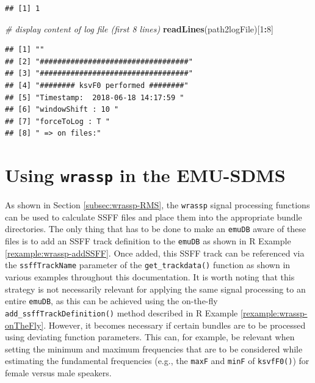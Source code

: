 \documentclass[]{book}
\newenvironment{Shaded}{\begin{snugshade}}{\end{snugshade}}
\newcommand{\CommentTok}[1]{\textcolor[rgb]{0.56,0.35,0.01}{\textit{#1}}}
\newcommand{\DecValTok}[1]{\textcolor[rgb]{0.00,0.00,0.81}{#1}}
\newcommand{\KeywordTok}[1]{\textcolor[rgb]{0.13,0.29,0.53}{\textbf{#1}}}
\newcommand{\NormalTok}[1]{#1}
\newcommand{\OperatorTok}[1]{\textcolor[rgb]{0.81,0.36,0.00}{\textbf{#1}}}
\theoremstyle{definition}
\theoremstyle{definition}
\theoremstyle{definition}
\theoremstyle{remark}
\begin{document}
\begin{verbatim}
## [1] 1
\end{verbatim}

\begin{Shaded}
\begin{Highlighting}[]
\CommentTok{# display content of log file (first 8 lines)}
\KeywordTok{readLines}\NormalTok{(path2logFile)[}\DecValTok{1}\OperatorTok{:}\DecValTok{8}\NormalTok{]}
\end{Highlighting}
\end{Shaded}

\begin{verbatim}
## [1] ""                                  
## [2] "##################################"
## [3] "##################################"
## [4] "######## ksvF0 performed ########" 
## [5] "Timestamp:  2018-06-18 14:17:59 "  
## [6] "windowShift : 10 "                 
## [7] "forceToLog : T "                   
## [8] " => on files:"
\end{verbatim}

\hypertarget{sec:wrassp_emu-sdms}{%
\section{\texorpdfstring{Using \texttt{wrassp} in the
EMU-SDMS}{Using wrassp in the EMU-SDMS}}\label{sec:wrassp_emu-sdms}}

As shown in Section \ref{subsec:wrassp-RMS}, the \texttt{wrassp} signal
processing functions can be used to calculate SSFF files and place them
into the appropriate bundle directories. The only thing that has to be
done to make an \texttt{emuDB} aware of these files is to add an SSFF
track definition to the \texttt{emuDB} as shown in R Example
\ref{rexample:wrassp-addSSFF}. Once added, this SSFF track can be
referenced via the \texttt{ssffTrackName} parameter of the
\texttt{get\_trackdata()} function as shown in various examples
throughout this documentation. It is worth noting that this strategy is
not necessarily relevant for applying the same signal processing to an
entire \texttt{emuDB}, as this can be achieved using the on-the-fly
\texttt{add\_ssffTrackDefinition()} method described in R Example
\ref{rexample:wrassp-onTheFly}. However, it becomes necessary if certain
bundles are to be processed using deviating function parameters. This
can, for example, be relevant when setting the minimum and maximum
frequencies that are to be considered while estimating the fundamental
frequencies (e.g., the \texttt{maxF} and \texttt{minF} of
\texttt{ksvfF0()}) for female versus male speakers.
\end{document}
